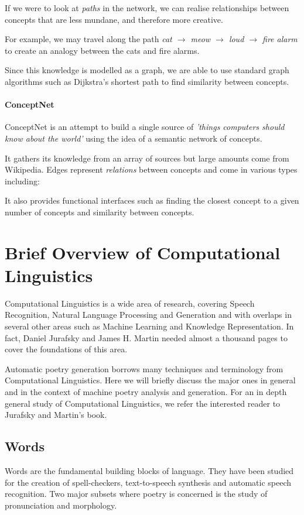 If we were to look at \textit{paths} in the network, we can realise relationships between concepts that are less mundane, and therefore more creative.

For example, we may travel along the path \textit{cat $\rightarrow$ meow $\rightarrow$ loud $\rightarrow$ fire alarm} to create an analogy between the cats and fire alarms.

Since this knowledge is modelled as a graph, we are able to use standard graph algorithms such as Dijkstra's shortest path\cite{dijkstra1959note} to find similarity between concepts.

\paragraph{ConceptNet}
\label{sec:conceptnet}
ConceptNet\cite{liu2004conceptnet} is an attempt to build a single source of \textit{'things computers should know about the world'} using the idea of a semantic network of concepts.

It gathers its knowledge from an array of sources but large amounts come from Wikipedia. Edges represent \textit{relations} between concepts and come in various types including:

It also provides functional interfaces such as finding the closest concept to a given number of concepts and similarity between concepts.

\section{Brief Overview of Computational Linguistics}
Computational Linguistics is a wide area of research, covering Speech Recognition, Natural Language Processing and Generation and with overlaps in several other areas such as Machine Learning and Knowledge Representation. In fact, Daniel Jurafsky and James H. Martin needed almost a thousand pages to cover the foundations of this area\cite{jurafsky2000speech}.

Automatic poetry generation borrows many techniques and terminology from Computational Linguistics. Here we will briefly discuss the major ones in general and in the context of machine poetry analysis and generation. For an in depth general study of Computational Linguistics, we refer the interested reader to Jurafsky and Martin's book.

\subsection{Words}
\label{sec:words}
Words are the fundamental building blocks of language. They have been studied for the creation of spell-checkers, text-to-speech synthesis and automatic speech recognition. Two major subsets where poetry is concerned is the study of pronunciation and morphology. 

